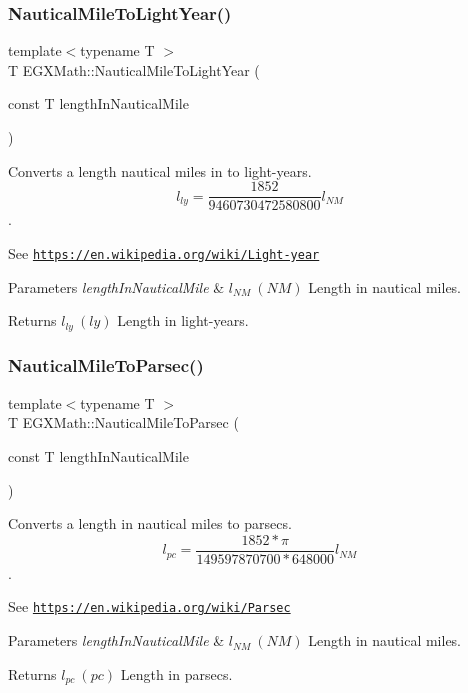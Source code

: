 \subsubsection{\texorpdfstring{Nautical\+Mile\+To\+Light\+Year()}{NauticalMileToLightYear()}}
{\footnotesize\ttfamily template$<$typename T $>$ \\
T E\+G\+X\+Math\+::\+Nautical\+Mile\+To\+Light\+Year (\begin{DoxyParamCaption}\item[{const T}]{length\+In\+Nautical\+Mile }\end{DoxyParamCaption})}



Converts a length nautical miles in to light-\/years. \[ l_{ly}= \frac{1852}{9460730472580800} l_{NM} \]. 

See \href{https://en.wikipedia.org/wiki/Light-year}{\tt https\+://en.\+wikipedia.\+org/wiki/\+Light-\/year} 
\begin{DoxyParams}{Parameters}
{\em length\+In\+Nautical\+Mile} & $ l_{NM}\ (NM)$ Length in nautical miles. \\
\hline
\end{DoxyParams}
\begin{DoxyReturn}{Returns}
$ l_{ly}\ (ly)$ Length in light-\/years. 
\end{DoxyReturn}
\mbox{\label{group___e_g_x_math-_conversions-_length_conversions-_non-_s_i-_nautical_mile-_astronomical_ga9ef59718174cef0ecf43e8eff8b961fe}} 
\subsubsection{\texorpdfstring{Nautical\+Mile\+To\+Parsec()}{NauticalMileToParsec()}}
{\footnotesize\ttfamily template$<$typename T $>$ \\
T E\+G\+X\+Math\+::\+Nautical\+Mile\+To\+Parsec (\begin{DoxyParamCaption}\item[{const T}]{length\+In\+Nautical\+Mile }\end{DoxyParamCaption})}



Converts a length in nautical miles to parsecs. \[ l_{pc}=\frac{1852 * \pi}{149597870700 * 648000} l_{NM} \]. 

See \href{https://en.wikipedia.org/wiki/Parsec}{\tt https\+://en.\+wikipedia.\+org/wiki/\+Parsec} 
\begin{DoxyParams}{Parameters}
{\em length\+In\+Nautical\+Mile} & $ l_{NM}\ (NM)$ Length in nautical miles. \\
\hline
\end{DoxyParams}
\begin{DoxyReturn}{Returns}
$ l_{pc}\ (pc)$ Length in parsecs. 
\end{DoxyReturn}
